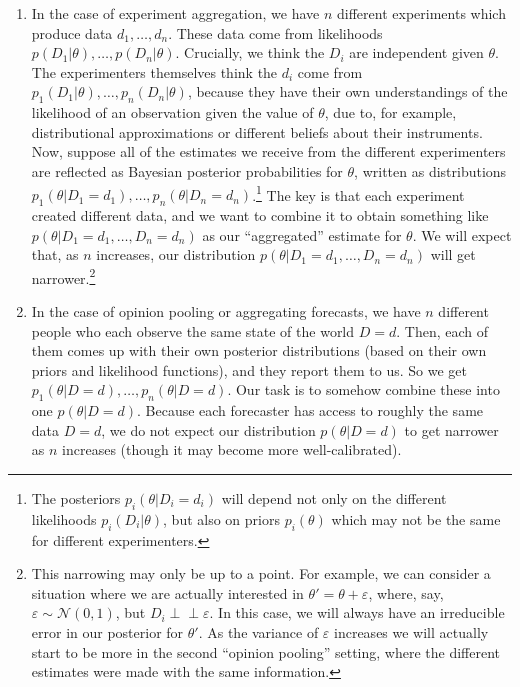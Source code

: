 \documentclass[12pt]{article}
\begin{document}
\begin{enumerate}
\item
  In the case of experiment aggregation, we have $n$ different experiments which produce data $d_1,\ldots,d_n$. These data come from likelihoods $p(D_1|\theta),\ldots,p(D_n|\theta)$. Crucially, we think the $D_i$ are independent given $\theta$. The experimenters themselves think the $d_i$ come from $p_1(D_1|\theta),\ldots,p_n(D_n|\theta)$, because they have their own understandings of the likelihood of an observation given the value of $\theta$, due to, for example, distributional approximations or different beliefs about their instruments. Now, suppose all of the estimates we receive from the different experimenters are reflected as Bayesian posterior probabilities for $\theta$, written as distributions $p_1(\theta|D_1=d_1),\ldots,p_n(\theta|D_n=d_n)$.\footnote{The posteriors $p_i(\theta|D_i=d_i)$ will depend not only on the different likelihoods $p_i(D_i|\theta)$, but also on priors $p_i(\theta)$ which may not be the same for different experimenters.} The key is that each experiment created different data, and we want to combine it to obtain something like $p(\theta|D_1=d_1,\ldots,D_n=d_n)$ as our ``aggregated'' estimate for $\theta$. We will expect that, as $n$ increases, our distribution $p(\theta|D_1=d_1,\ldots,D_n=d_n)$ will get narrower.\footnote{This narrowing may only be up to a point. For example, we can consider a situation where we are actually interested in $\theta'=\theta+\varepsilon$, where, say, $\varepsilon\sim\mathcal{N}(0,1)$, but $D_i\perp\!\!\!\!\perp\varepsilon$. In this case, we will always have an irreducible error in our posterior for $\theta'$. As the variance of $\varepsilon$ increases we will actually start to be more in the second ``opinion pooling'' setting, where the different estimates were made with the same information.}
\item
  In the case of opinion pooling or aggregating forecasts, we have $n$ different people who each observe the same state of the world $D=d$. Then, each of them comes up with their own posterior distributions (based on their own priors and likelihood functions), and they report them to us. So we get $p_1(\theta|D=d),\ldots,p_n(\theta|D=d)$. Our task is to somehow combine these into one $p(\theta|D=d)$. Because each forecaster has access to roughly the same data $D=d$, we do not expect our distribution $p(\theta|D=d)$ to get narrower as $n$ increases (though it may become more well-calibrated).
\end{enumerate}
\end{document}
